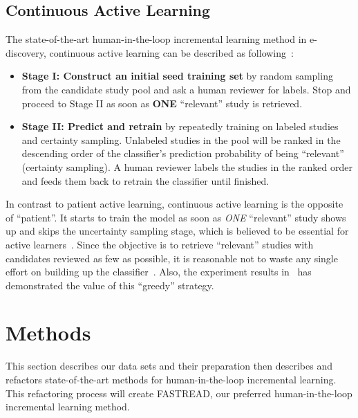 \documentclass{svjour3}
\theoremstyle{break}
\begin{document}
\subsection{Continuous Active Learning}
\label{sect: Continuous Active Learning}

The state-of-the-art human-in-the-loop incremental learning method in e-discovery, continuous active learning can be described as following~\cite{cormack2014evaluation,cormack2015autonomy,tredennick2015}:

\begin{itemize}

\item
{\bf Stage I: Construct an initial seed training set} by random sampling from the candidate study pool and ask a human reviewer for labels. Stop and proceed to Stage II as soon as \textbf{ONE} ``relevant'' study is retrieved.

\item
{\bf Stage II: Predict and retrain} by repeatedly training on labeled studies and certainty sampling. Unlabeled studies in the pool will be ranked in the descending order of the classifier's prediction probability of being ``relevant'' (certainty sampling). A human reviewer labels the studies in the ranked order and feeds them back to retrain the classifier until finished.

\end{itemize}

In contrast to patient active learning, continuous active learning is the opposite of ``patient''. It starts to train the model as soon as \textit{ONE} ``relevant'' study shows up and skips the uncertainty sampling stage, which is believed to be essential for active learners~\cite{settles2012active}. Since the objective is to retrieve ``relevant'' studies with candidates reviewed as few as possible, it is reasonable not to waste any single effort on building up the classifier~\cite{cormack2014evaluation,tredennick2015}. Also, the experiment results in~\cite{cormack2014evaluation} has demonstrated the value of this ``greedy'' strategy.




\section{Methods}
\label{sect: Method}

This section describes our data sets and their preparation then describes and refactors state-of-the-art methods for human-in-the-loop incremental learning.
This refactoring process will create FASTREAD, our preferred human-in-the-loop incremental learning
method. 
\end{document}
